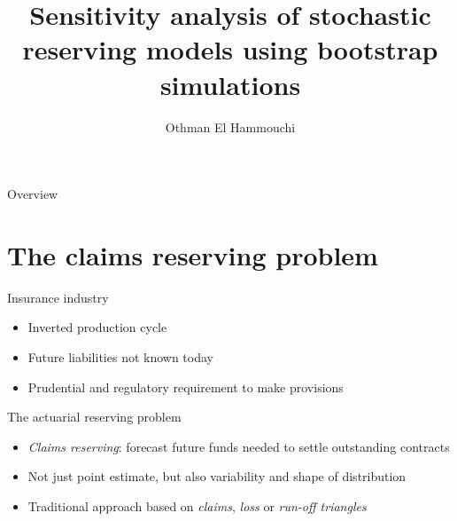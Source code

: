 \documentclass[tikz]{beamer}
\title{Sensitivity analysis of stochastic reserving models using bootstrap simulations}
\author{Othman El Hammouchi}
\begin{document}
\frame{\maketitle}

\begin{frame}{Overview}
    \tableofcontents
\end{frame}

\section{The claims reserving problem}

\begin{frame}{Insurance industry}
    \begin{itemize}
        \item Inverted production cycle
        \item Future liabilities not known today
        \item Prudential and regulatory requirement to make provisions
    \end{itemize}
\end{frame}

\begin{frame}{The actuarial reserving problem}
    \begin{itemize}
        \item \emph{Claims reserving}: forecast future funds needed to settle outstanding contracts
        \item Not just point estimate, but also variability and shape of distribution
        \item Traditional approach based on \emph{claims}, \emph{loss} or \emph{run-off triangles}
    \end{itemize}
\end{frame}
\end{document}
